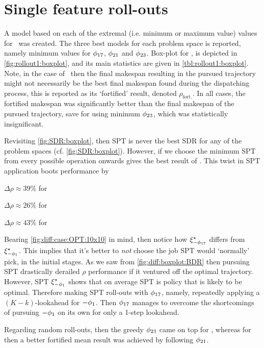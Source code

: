 \section{Single feature roll-outs}

A model based on each of the extremal (i.e. minimum or maximum value) values 
for \phiGlobalRelated\ was created. The three best models for each problem 
space is reported, namely minimum values for $\phi_{17}$, $\phi_{21}$ and 
$\phi_{23}$. 
Box-plot for \namerho, is depicted in \cref{fig:rollout1:boxplot}, and its 
main statistics are given in \cref{tbl:rollout1:boxplot}.
Note, in the case of \phiRNDRelated\ then the final makespan resulting in the 
pursued trajectory might not necessarily be the best final makespan found 
during the dispatching process, this is reported as its `fortified' result, 
denoted $\rho_{\text{fort.}}$. 
In all cases, the fortified makespan was significantly better than the final 
makespan of the pursued trajectory, save for  using minimum 
$\phi_{23}$, which was statistically insignificant.

Revisiting \cref{fig:SDR:boxplot}, then SPT is never the best SDR for any of 
the problem spaces (cf. \cref{fig:SDR:boxplot}).
However, if we choose the minimum SPT from every possible operation onwards 
gives the best result of \phiSDRRelated. This twist in SPT application boots 
performance by 
\begin{enumerate*}
    \item $\Delta\rho\approx 39\%$ for 
    \item $\Delta\rho\approx 26\%$ for 
    \item $\Delta\rho\approx 43\%$ for 
\end{enumerate*}
Bearing \cref{fig:diff:case:OPT:10x10} in mind, then notice how 
$\xi^{\star}_{-\phi_{17}}$ differs from $\xi^{\star}_{-\phi_1}$. This implies 
that it's better to \emph{not} choose the job SPT would `normally' pick, in the 
initial stages. As we saw from \cref{fig:diff:boxplot:BDR} then pursuing SPT 
drastically derailed $\rho$ performance if it ventured off the optimal 
trajectory. 
However, SPT $\xi^{\star}_{-\phi_1}$ shows that on average SPT is policy that 
is likely to be optimal. 
Therefore making SPT roll-outs with $\phi_{17}$, namely, repeatedly applying a 
$(K-k)$-lookahead for $-\phi_1$. 
Then $\phi_{17}$ manages to overcome the shortcomings of pursuing $-\phi_1$ on 
its own for only a 1-step lookahead.

Regarding random roll-outs, then the greedy $\phi_{23}$ came on top for 
\Problem[6\times5]{\train}, whereas for  then a better fortified 
mean result was achieved by following $\phi_{21}$.

